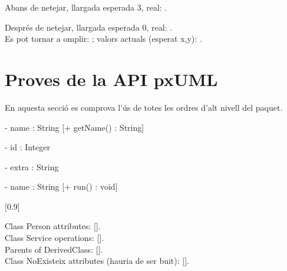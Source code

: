 \documentclass[fake,cover-config=offset,default]{P3CTeX}
\begin{document}

	Abans de netejar, llargada esperada 3, real: .\\

	Després de netejar, llargada esperada 0, real: .\\
	Es pot tornar a omplir:
	; valors actuals (esperat x,y): .
	\section{Proves de la API pxUML}

	En aquesta secció es comprova l'ús de totes les ordres d'alt nivell del paquet.

	{
		- name : String
	}
	[+ getName() : String]


	{
		- id : Integer
	}

	{
		- extra : String
	}


	{
		- name : String
	}
	[+ run() : void]

	[0.9\linewidth]

	Class Person attributes: [].\\
	Class Service operations: [].\\
	Parents of DerivedClass: [].\\

	Class NoExisteix attributes (hauria de ser buit): [].
\end{document}
